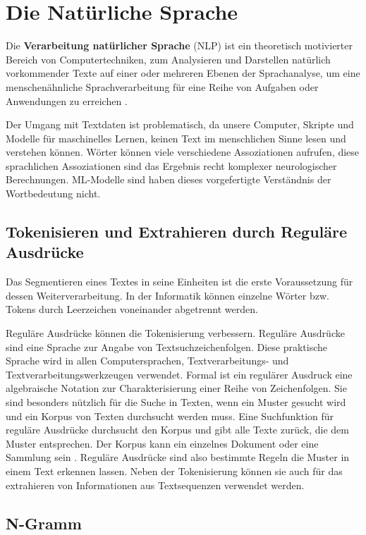 \chapter{Die Natürliche Sprache}\label{ch3}


Die \textbf{Verarbeitung natürlicher Sprache} (NLP) ist ein theoretisch motivierter Bereich von Computertechniken, zum Analysieren und Darstellen natürlich vorkommender Texte auf einer oder mehreren Ebenen der Sprachanalyse, um eine menschenähnliche Sprachverarbeitung für eine Reihe von Aufgaben oder Anwendungen zu erreichen \cite*{Liddy}.

Der Umgang mit Textdaten ist problematisch, da unsere Computer, Skripte und Modelle für maschinelles Lernen, keinen Text im menschlichen Sinne lesen und verstehen können. Wörter können viele verschiedene Assoziationen aufrufen, diese sprachlichen Assoziationen sind das Ergebnis recht komplexer neurologischer Berechnungen. ML-Modelle sind haben dieses vorgefertigte Verständnis der Wortbedeutung nicht.


\section{Tokenisieren und Extrahieren durch Reguläre Ausdrücke}
Das Segmentieren eines Textes in seine Einheiten ist die erste Voraussetzung für dessen Weiterverarbeitung. In der Informatik können einzelne Wörter bzw. Tokens durch Leerzeichen voneinander abgetrennt werden.

Reguläre Ausdrücke können die Tokenisierung verbessern. Reguläre Ausdrücke sind eine Sprache zur Angabe von Textsuchzeichenfolgen. Diese praktische Sprache wird in allen Computersprachen, Textverarbeitungs- und Textverarbeitungswerkzeugen verwendet. Formal ist ein regulärer Ausdruck eine algebraische Notation zur Charakterisierung einer Reihe von Zeichenfolgen. Sie sind besonders nützlich für die Suche in Texten, wenn ein Muster gesucht wird und ein Korpus von Texten durchsucht werden muss. Eine Suchfunktion für reguläre Ausdrücke durchsucht den Korpus und gibt alle Texte zurück, die dem Muster entsprechen. Der Korpus kann ein einzelnes Dokument oder eine Sammlung sein \cite*[3]{Jurafskya}. Reguläre Ausdrücke sind also bestimmte Regeln die Muster in einem Text erkennen lassen. Neben der Tokenisierung können sie auch für das extrahieren von Informationen aus Textsequenzen verwendet werden.

\section{N-Gramm}

